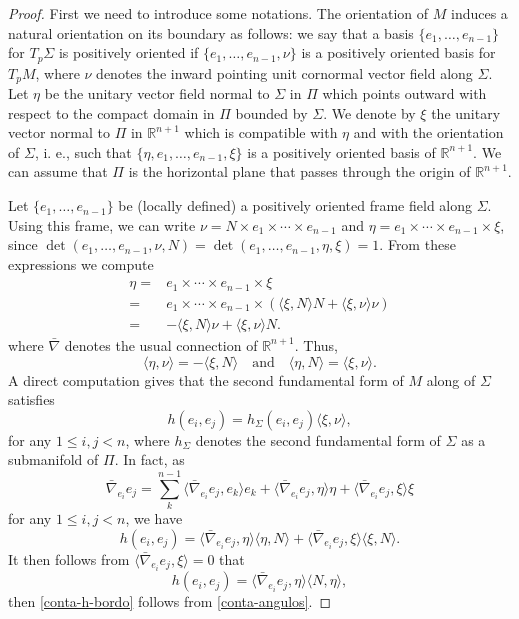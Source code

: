 \documentclass[10pt,a4paper]{amsart}
\begin{document}
\begin{proof}
 First we need to introduce some notations. The orientation of $M$ induces a natural orientation on its boundary as follows: we say that a basis $\{e_1, \ldots, e_{n-1}\}$ for $T_p\Sigma$ is positively oriented if $\{e_1, \ldots, e_{n-1}, \nu\}$ is a positively oriented basis for $T_pM$,  where $\nu$ denotes the inward pointing unit cornormal vector field along $\Sigma$. Let $\eta$  be the unitary vector field normal to $\Sigma$ in $\Pi$ which points outward with respect to the compact domain in $\Pi$ bounded by $\Sigma$. We denote by $\xi$ the unitary vector  normal to $\Pi$  in $\mathbb{R}^{n+1}$ which is compatible with $\eta$ and with the orientation of $\Sigma$, i. e., such that $\{\eta, e_1, \ldots, e_{n-1},\xi\}$ is a positively oriented basis of $\mathbb{R}^{n+1}$. We can assume that $\Pi$ is the horizontal plane that passes through the origin of $\mathbb{R}^{n+1}$.

Let $\{e_1, \ldots, e_{n-1}\}$ be (locally defined) a positively oriented frame field along $\Sigma$. Using this frame, we can write $\nu = N\times e_1\times\cdots\times e_{n-1} $ and $\eta= e_1\times\cdots\times e_{n-1} \times\xi$, since $\det( e_1, \dots, e_{n-1},\nu,  N)=\det( e_1, \dots, e_{n-1}, \eta, \xi)=1.$ From these expressions we compute
\begin{align*}
\eta =& e_1\times\cdots\times e_{n-1} \times \xi \\ =& e_1\times\cdots\times e_{n-1} \times (\langle\xi, N\rangle N+\langle \xi, \nu\rangle \nu)\\ =& -\langle\xi, N\rangle \nu+\langle \xi, \nu\rangle N.
\end{align*}
where   $\bar\nabla$ denotes  the usual connection of $\mathbb{R}^{n+1}$. 
Thus,
\begin{equation}
		\label{conta-angulos}
\langle \eta ,\nu\rangle=-\langle \xi, N\rangle \quad \textrm{and}\quad \langle \eta , N\rangle=\langle \xi, \nu\rangle.
\end{equation}
A direct computation gives that the second fundamental form of $M$ along of $\Sigma$ satisfies
\begin{equation}
	\label{conta-h-bordo}
h(e_i,e_j)=  h_{\Sigma} (e_i,e_j)\langle \xi, \nu\rangle,
\end{equation}
for any $1\leq i,j<n$, where $h_\Sigma$ denotes the second fundamental form of $\Sigma$ as a submanifold of $\Pi$. In fact,  as
\[
\bar \nabla_{e_i}e_j=\sum_k^{n-1}\langle \bar \nabla_{e_i}e_j, e_k\rangle e_k+\langle\bar \nabla_{e_i}e_j, \eta\rangle \eta+\langle\bar \nabla_{e_i}e_j, \xi\rangle \xi
\]
for any $1\leq i,j<n$, we have
\[
h(e_i, e_j)=\langle\bar \nabla_{e_i}e_j, \eta\rangle\langle\eta,N\rangle + \langle \bar \nabla_{e_i}e_j, \xi \rangle \langle\xi, N\rangle.
\]
It then follows from $\langle \bar\nabla_{e_i}e_j, \xi \rangle =0$ that
\[
h(e_i,e_j)=\langle \bar \nabla_{e_i}e_j, \eta\rangle  \langle N,\eta\rangle,
\]
then \eqref{conta-h-bordo} follows from \eqref{conta-angulos}.


\end{proof}
\end{document}
